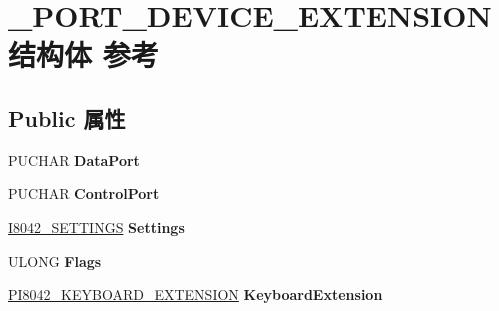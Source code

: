 \hypertarget{struct___p_o_r_t___d_e_v_i_c_e___e_x_t_e_n_s_i_o_n}{}\section{\+\_\+\+P\+O\+R\+T\+\_\+\+D\+E\+V\+I\+C\+E\+\_\+\+E\+X\+T\+E\+N\+S\+I\+O\+N结构体 参考}
\label{struct___p_o_r_t___d_e_v_i_c_e___e_x_t_e_n_s_i_o_n}
\subsection*{Public 属性}
\begin{DoxyCompactItemize}
\item 
\mbox{\label{struct___p_o_r_t___d_e_v_i_c_e___e_x_t_e_n_s_i_o_n_a981669f4c612a6444aedd946fc7ebbbf}} 
P\+U\+C\+H\+AR {\bfseries Data\+Port}
\item 
\mbox{\label{struct___p_o_r_t___d_e_v_i_c_e___e_x_t_e_n_s_i_o_n_a00047656faa1a355665dc4939777b01b}} 
P\+U\+C\+H\+AR {\bfseries Control\+Port}
\item 
\mbox{\label{struct___p_o_r_t___d_e_v_i_c_e___e_x_t_e_n_s_i_o_n_a5e3ae4254c4841e6f45cf30b9b2844ef}} 
\hyperlink{struct___i8042___s_e_t_t_i_n_g_s}{I8042\+\_\+\+S\+E\+T\+T\+I\+N\+GS} {\bfseries Settings}
\item 
\mbox{\label{struct___p_o_r_t___d_e_v_i_c_e___e_x_t_e_n_s_i_o_n_a9d85683b3f799c19311050a19d7bef95}} 
U\+L\+O\+NG {\bfseries Flags}
\item 
\mbox{\label{struct___p_o_r_t___d_e_v_i_c_e___e_x_t_e_n_s_i_o_n_ad580b0164d49991ff4dbb040060a4828}} 
\hyperlink{struct___i8042___k_e_y_b_o_a_r_d___e_x_t_e_n_s_i_o_n}{P\+I8042\+\_\+\+K\+E\+Y\+B\+O\+A\+R\+D\+\_\+\+E\+X\+T\+E\+N\+S\+I\+ON} {\bfseries Keyboard\+Extension}
\item 
\mbox{\label{struct___p_o_r_t___d_e_v_i_c_e___e_x_t_e_n_s_i_o_n_a0be44f647a6cee9db91a4e35a29ea7ac}} 

\end{DoxyCompactItemize}

